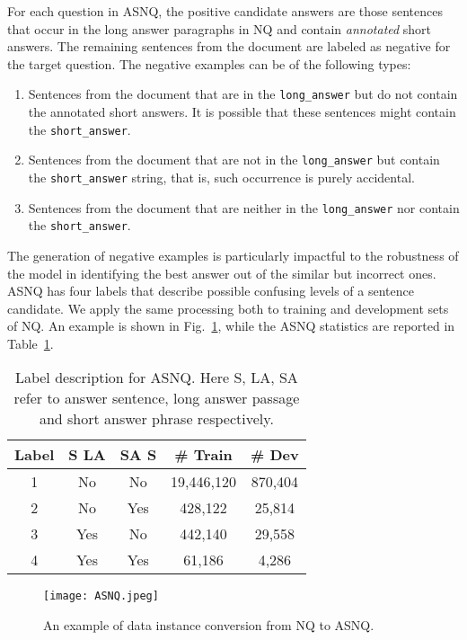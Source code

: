 \documentclass[letterpaper]{article} \usepackage{aaai20}  \usepackage{times}  \usepackage{helvet} \usepackage{courier}  \usepackage[hyphens]{url}  \usepackage{graphicx} \urlstyle{rm} \def\UrlFont{\rm}  \usepackage{graphicx}  \usepackage{todonotes}
\begin{document}
For each question in ASNQ, the positive candidate answers are those sentences that occur in the long answer paragraphs in NQ and contain \emph{annotated} short answers. The remaining sentences from the document are labeled as negative for the target question. The negative examples can be of the following types:
\begin{enumerate}
\item Sentences from the document that are in the \texttt{long\_answer} but do not contain the annotated short answers. It is possible that these sentences might contain the \texttt{short\_answer}.
\item Sentences from the document that are not in the \texttt{long\_answer} but contain the \texttt{short\_answer} string, that is, such occurrence is purely accidental.
\item Sentences from the document that are neither in the \texttt{long\_answer} nor contain the \texttt{short\_answer}.
\end{enumerate}
\noindent 

The generation of negative examples is particularly impactful to the robustness of the model in identifying the best answer out of the similar but incorrect ones.  ASNQ has four labels that describe possible confusing levels of a sentence candidate.
We apply the same processing both to training and development sets of NQ. An example is shown in Fig.~\ref{ASNQ_exp}, while the ASNQ statistics are reported in Table~\ref{Table:ASNQ_labels}.
\begin{table}
\small
\center
\begin{center}
\begin{tabular}{|c | c | c | c | c |} 
 \hline
 Label & S  LA & SA  S & \# Train & \# Dev  \\
 \hline
1 & No & No & 19,446,120 & 870,404  \\ 
 \hline
2 & No & Yes & 428,122 &  25,814\\
 \hline
3 & Yes & No & 442,140 & 29,558\\
 \hline
4 & Yes & Yes & 61,186 &  4,286 \\
 \hline
\end{tabular}
\caption{Label description for ASNQ. 
Here S, LA, SA refer to answer sentence, long answer passage and short answer phrase respectively.}
\label{Table:ASNQ_labels}
\end{center}
    \vspace{-1em}
\end{table}
 \begin{figure}[t]
   \center
    \texttt{[image: ASNQ.jpeg]}
    \caption{An example of data instance conversion from NQ to ASNQ.}
    \label{ASNQ_exp}
\end{figure}
\end{document}
